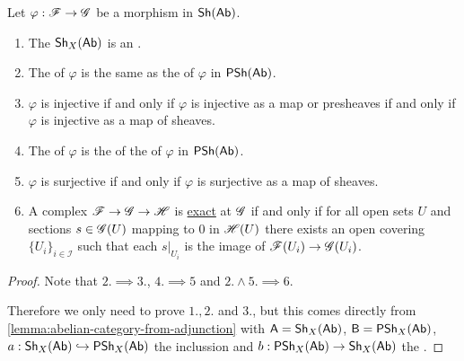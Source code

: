 \documentclass[../main.tex]{subfiles}
\begin{document}
\begin{proposition}
  Let \(\varphi: \mathscr{F} \to \mathscr{G}\) be a morphism in \(\mathsf{Sh}(\mathsf{Ab})\).
  \begin{enumerate}
    \item The  \(\mathsf{Sh}_{X}(\mathsf{Ab})\) is an .
    \item The  of \(\varphi\) is the same as the  of \(\varphi\) in \(\mathsf{PSh}(\mathsf{Ab})\).
    \item \(\varphi\) is injective if and only if \(\varphi\) is injective as a map or presheaves if and only if \(\varphi\) is injective as a map of sheaves.
    \item The  of \(\varphi\) is the  of the  of \(\varphi\) in \(\mathsf{PSh}(\mathsf{Ab})\).
    \item \(\varphi\) is surjective if and only if \(\varphi\) is surjective as a map of sheaves.
    \item A complex \(\mathscr{F} \to \mathscr{G} \to \mathscr{H}\) is \hyperref[def:exact-complex]{exact} at \(\mathscr{G}\) if and only if for all open sets \(U\) and sections \(s \in \mathscr{G}(U)\) mapping to 0 in \(\mathscr{H}(U)\) there exists an open covering \(\{U_{i}\}_{i \in \mathcal{I}}\) such that each \(s|_{U_{i}}\) is the image of \(\mathscr{F}(U_{i}) \to \mathscr{G}(U_{i})\).
  \end{enumerate}
\end{proposition}
\begin{proof}
  Note that \(2. \implies 3.\), \(4. \implies 5\) and \(2. \land 5. \implies 6.\)

  Therefore we only need to prove \(1., 2.\) and \(3.\), but this comes directly from \autoref{lemma:abelian-category-from-adjunction} with \(\mathsf{A} = \mathsf{Sh}_{X}(\mathsf{Ab})\), \(\mathsf{B} = \mathsf{PSh}_{X}(\mathsf{Ab})\), \(a: \mathsf{Sh}_{X}(\mathsf{Ab}) \hookrightarrow \mathsf{PSh}_{X}(\mathsf{Ab})\) the inclussion  and \(b: \mathsf{PSh}_{X}(\mathsf{Ab}) \to \mathsf{Sh}_{X}(\mathsf{Ab})\) the  .
\end{proof}
\end{document}

